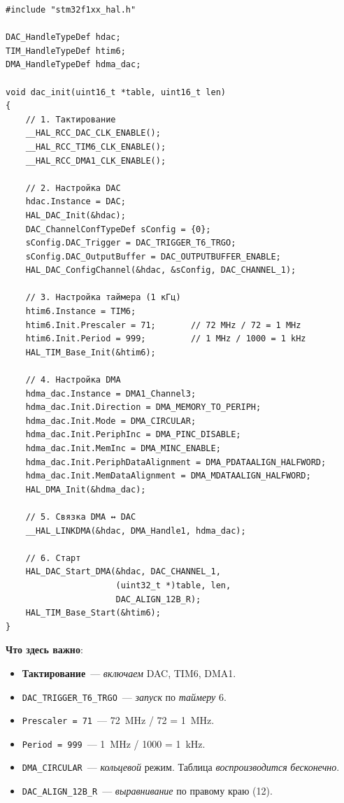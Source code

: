 \begin{listing}[htbp]
\begin{verbatim}
#include "stm32f1xx_hal.h"

DAC_HandleTypeDef hdac;
TIM_HandleTypeDef htim6;
DMA_HandleTypeDef hdma_dac;

void dac_init(uint16_t *table, uint16_t len)
{
    // 1. Тактирование
    __HAL_RCC_DAC_CLK_ENABLE();
    __HAL_RCC_TIM6_CLK_ENABLE();
    __HAL_RCC_DMA1_CLK_ENABLE();

    // 2. Настройка DAC
    hdac.Instance = DAC;
    HAL_DAC_Init(&hdac);
    DAC_ChannelConfTypeDef sConfig = {0};
    sConfig.DAC_Trigger = DAC_TRIGGER_T6_TRGO;
    sConfig.DAC_OutputBuffer = DAC_OUTPUTBUFFER_ENABLE;
    HAL_DAC_ConfigChannel(&hdac, &sConfig, DAC_CHANNEL_1);

    // 3. Настройка таймера (1 кГц)
    htim6.Instance = TIM6;
    htim6.Init.Prescaler = 71;       // 72 MHz / 72 = 1 MHz
    htim6.Init.Period = 999;         // 1 MHz / 1000 = 1 kHz
    HAL_TIM_Base_Init(&htim6);

    // 4. Настройка DMA
    hdma_dac.Instance = DMA1_Channel3;
    hdma_dac.Init.Direction = DMA_MEMORY_TO_PERIPH;
    hdma_dac.Init.Mode = DMA_CIRCULAR;
    hdma_dac.Init.PeriphInc = DMA_PINC_DISABLE;
    hdma_dac.Init.MemInc = DMA_MINC_ENABLE;
    hdma_dac.Init.PeriphDataAlignment = DMA_PDATAALIGN_HALFWORD;
    hdma_dac.Init.MemDataAlignment = DMA_MDATAALIGN_HALFWORD;
    HAL_DMA_Init(&hdma_dac);

    // 5. Связка DMA ↔ DAC
    __HAL_LINKDMA(&hdac, DMA_Handle1, hdma_dac);

    // 6. Старт
    HAL_DAC_Start_DMA(&hdac, DAC_CHANNEL_1,
                      (uint32_t *)table, len,
                      DAC_ALIGN_12B_R);
    HAL_TIM_Base_Start(&htim6);
}
\end{verbatim}
\caption{\texttt{dac\_init()}~--- настройка DAC + TIM + DMA}
\label{lst:gen-dac-init}
\end{listing}

\textbf{Что здесь важно}:
\begin{itemize}
    \item \textbf{Тактирование}~--- \emph{включаем} DAC,
          TIM6, DMA1.
    \item \texttt{DAC\_TRIGGER\_T6\_TRGO}~--- \emph{запуск}
          по \emph{таймеру} 6.
    \item \texttt{Prescaler = 71}~--- \SI{72}{\mega\hertz}
          / 72 = \SI{1}{\mega\hertz}.
    \item \texttt{Period = 999}~--- \SI{1}{\mega\hertz}
          / 1000 = \SI{1}{\kilo\hertz}.
    \item \texttt{DMA\_CIRCULAR}~--- \emph{кольцевой}
          режим. Таблица \emph{воспроизводится}
          \emph{бесконечно}.
    \item \texttt{DAC\_ALIGN\_12B\_R}~--- \emph{выравнивание}
          по правому краю (\SI{12}{\bit}).
\end{itemize}

